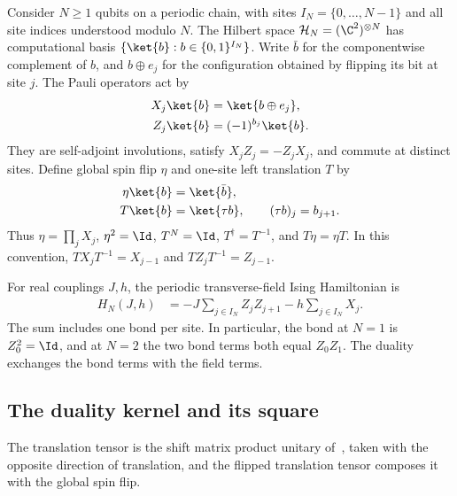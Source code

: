 Consider $N\geq1$ qubits on a periodic chain, with sites
$I_N=\{0,\ldots,N-1\}$ and all site indices understood modulo $N$.
The Hilbert space $\mathcal H_N=(\C^2)^{\otimes N}$ has computational
basis $\{\ket{b}:b\in\{0,1\}^{I_N}\}$. Write $\bar b$ for the
componentwise complement of $b$, and $b\oplus e_j$ for the configuration
obtained by flipping its bit at site $j$. The Pauli operators act by
\begin{align}
    X_j\ket{b} & =\ket{b\oplus e_j},
    \notag                           \\
    Z_j\ket{b} & =(-1)^{b_j}\ket{b}.
    \label{eq:asymex_kw_pauli}
\end{align}
They are self-adjoint involutions, satisfy $X_jZ_j=-Z_jX_j$, and commute
at distinct sites. Define global spin flip $\eta$ and one-site left
translation $T$ by
\begin{align}
    \eta\ket{b} & =\ket{\bar b},
    \notag                       \\
    T\ket{b}    & =\ket{\tau b},
    \qquad (\tau b)_j=b_{j+1}.
    \label{eq:asymex_kw_translation}
\end{align}
Thus $\eta=\prod_jX_j$, $\eta^2=\Id$, $T^N=\Id$,
$T^\dagger=T^{-1}$, and $T\eta=\eta T$. In this convention,
$TX_jT^{-1}=X_{j-1}$ and $TZ_jT^{-1}=Z_{j-1}$.

For real couplings $J,h$, the periodic transverse-field Ising Hamiltonian is
\begin{align}
    H_N(J,h) & =-J\sum_{j\in I_N}Z_jZ_{j+1}-h\sum_{j\in I_N}X_j.
    \label{eq:asymex_kw_ising}
\end{align}
The sum includes one bond per site. In particular, the bond at $N=1$
is $Z_0^2=\Id$, and at $N=2$ the two bond terms both equal $Z_0Z_1$.
The duality exchanges the bond terms with the field terms.

\subsection{The duality kernel and its square}

The translation tensor is the shift matrix product unitary
of~\cite[Appendix~A, ``The shift MPU'']{Cirac2021Matrix}, taken with
the opposite direction of translation, and the flipped translation
tensor composes it with the global spin flip.

